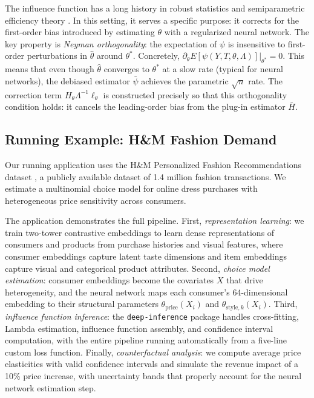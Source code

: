 The influence function has a long history in robust statistics \citep{hampel1974influence} and semiparametric efficiency theory \citep{newey1994large}. In this setting, it serves a specific purpose: it corrects for the first-order bias introduced by estimating $\theta$ with a regularized neural network. The key property is \emph{Neyman orthogonality}: the expectation of $\psi$ is insensitive to first-order perturbations in $\hat{\theta}$ around $\theta^*$. Concretely, $\partial_\theta E[\psi(Y, T, \theta, \Lambda)]|_{\theta^*} = 0$. This means that even though $\hat{\theta}$ converges to $\theta^*$ at a slow rate (typical for neural networks), the debiased estimator $\bar{\psi}$ achieves the parametric $\sqrt{n}$ rate. The correction term $H_\theta \Lambda^{-1} \ell_\theta$ is constructed precisely so that this orthogonality condition holds: it cancels the leading-order bias from the plug-in estimator $\bar{H}$.

\subsection{Running Example: H\&M Fashion Demand}

Our running application uses the H\&M Personalized Fashion Recommendations dataset \citep{hm2022kaggle}, a publicly available dataset of 1.4 million fashion transactions. We estimate a multinomial choice model for online dress purchases with heterogeneous price sensitivity across consumers.

The application demonstrates the full pipeline. First, \emph{representation learning}: we train two-tower contrastive embeddings \citep{oord2018representation} to learn dense representations of consumers and products from purchase histories and visual features, where consumer embeddings capture latent taste dimensions and item embeddings capture visual and categorical product attributes. Second, \emph{choice model estimation}: consumer embeddings become the covariates $X$ that drive heterogeneity, and the neural network maps each consumer's 64-dimensional embedding to their structural parameters $\theta_{\text{price}}(X_i)$ and $\theta_{\text{style},k}(X_i)$. Third, \emph{influence function inference}: the \texttt{deep-inference} package handles cross-fitting, Lambda estimation, influence function assembly, and confidence interval computation, with the entire pipeline running automatically from a five-line custom loss function. Finally, \emph{counterfactual analysis}: we compute average price elasticities with valid confidence intervals and simulate the revenue impact of a 10\% price increase, with uncertainty bands that properly account for the neural network estimation step.

